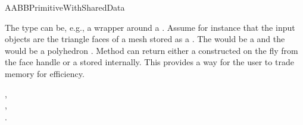 \begin{ccRefConcept}{AABBPrimitiveWithSharedData}
\ccSeeAlso
{}\\

\ccExample

The  type can be, e.g., a wrapper around a . Assume for instance that the input objects are the triangle faces of a mesh stored as a . The  would be a  and the  would be a polyhedron . Method  can return either a  constructed on the fly from the face handle or a  stored internally. This provides a way for the user to trade memory for efficiency.

\ccHasModels
{},\\
,\\
.\\


\end{ccRefConcept}

\ccRefPageEnd
